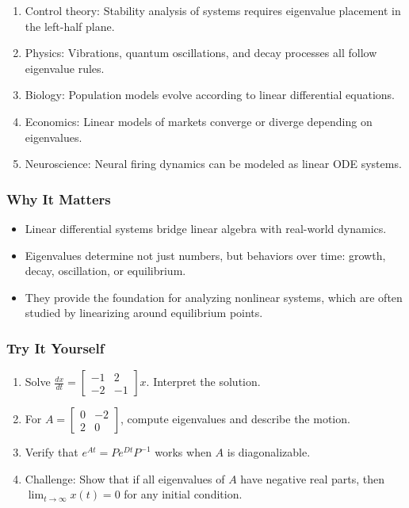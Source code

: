 \documentclass[
  letterpaper,
  DIV=11,
  numbers=noendperiod]{scrreprt}
\providecommand{\tightlist}{%
  \setlength{\itemsep}{0pt}\setlength{\parskip}{0pt}}
\begin{document}
\begin{enumerate}
\def\labelenumi{\arabic{enumi}.}
\tightlist
\item
  Control theory: Stability analysis of systems requires eigenvalue
  placement in the left-half plane.
\item
  Physics: Vibrations, quantum oscillations, and decay processes all
  follow eigenvalue rules.
\item
  Biology: Population models evolve according to linear differential
  equations.
\item
  Economics: Linear models of markets converge or diverge depending on
  eigenvalues.
\item
  Neuroscience: Neural firing dynamics can be modeled as linear ODE
  systems.
\end{enumerate}

\subsubsection{Why It Matters}\label{why-it-matters-66}

\begin{itemize}
\tightlist
\item
  Linear differential systems bridge linear algebra with real-world
  dynamics.
\item
  Eigenvalues determine not just numbers, but behaviors over time:
  growth, decay, oscillation, or equilibrium.
\item
  They provide the foundation for analyzing nonlinear systems, which are
  often studied by linearizing around equilibrium points.
\end{itemize}

\subsubsection{Try It Yourself}\label{try-it-yourself-69}

\begin{enumerate}
\def\labelenumi{\arabic{enumi}.}
\tightlist
\item
  Solve
  \(\frac{dx}{dt} = \begin{bmatrix} -1 & 2 \\ -2 & -1 \end{bmatrix}x\).
  Interpret the solution.
\item
  For \(A = \begin{bmatrix} 0 & -2 \\ 2 & 0 \end{bmatrix}\), compute
  eigenvalues and describe the motion.
\item
  Verify that \(e^{At} = P e^{Dt} P^{-1}\) works when \(A\) is
  diagonalizable.
\item
  Challenge: Show that if all eigenvalues of \(A\) have negative real
  parts, then \(\lim_{t \to \infty} x(t) = 0\) for any initial
  condition.
\end{enumerate}
\end{document}
